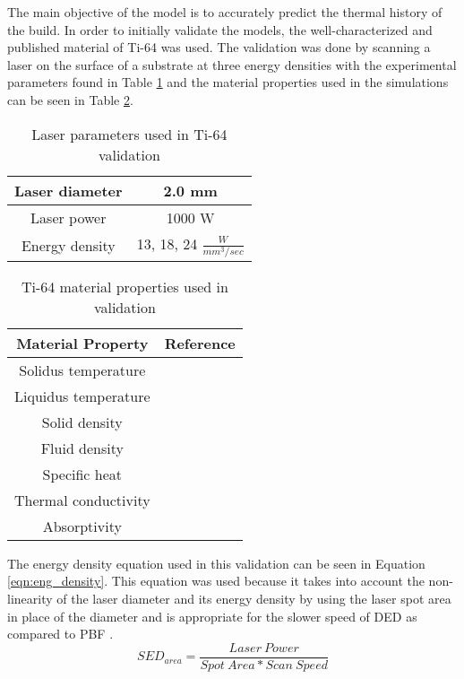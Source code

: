 The main objective of the model is to accurately predict the thermal history of the build.  
In order to initially validate the models, the well-characterized and published material of Ti-64 was used.  The validation was done by scanning a laser on the surface of a substrate at three energy densities with the experimental parameters found in Table \ref{tab:ti64_parameters} and the material properties used in the simulations can be seen in Table \ref{tab:ti64_properties}.
\begin{table}[!htb] \centering
	\caption{Laser parameters used in Ti-64 validation}
	\label{tab:ti64_parameters}
		\begin{tabular}{|c|c|} \hline 
			Laser diameter & 2.0 mm \\ \hline
			Laser power & 1000 W \\ \hline
			Energy density & 13, 18, 24 $\frac{W}{mm^3/sec}$ \\ \hline
		\end{tabular}
\end{table}
\begin{table}[!htb] \centering
	\caption{Ti-64  material properties used in validation}
	\label{tab:ti64_properties}
	\begin{tabular}{|c|c|} \hline
		Material Property & Reference \\ \hline
		Solidus temperature & \cite{welschgerhard_1993} \\ \hline
		Liquidus temperature & \cite{mills_2002} \\ \hline
		Solid density  & \cite{mills_2002} \\ \hline
		Fluid density & \cite{mills_2002} \\ \hline
		Specific heat & \cite{boivineau_2006} \\ \hline
		Thermal conductivity & \cite{boivineau_2006} \\ \hline
		Absorptivity & \cite{fan_2012} \\ \hline
	\end{tabular}
\end{table}

The energy density equation used in this validation can be seen in Equation \ref{eqn:eng_density}.  This equation was used because it takes into account the non-linearity of the laser diameter and its energy density by using the laser spot area in place of the diameter and is appropriate for the slower speed of \ac{DED} as compared to \ac{PBF} \cite{kurzynowskiEffectScanningSupport2019}.
\begin{equation}
	SED_{area} = \frac{Laser\ Power}{Spot\ Area * Scan\ Speed} \label{eqn:eng_density}
\end{equation}

